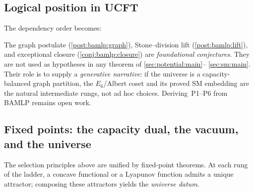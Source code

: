 \subsection{Logical position in UCFT}
\label{sec:bamlp:position}

The dependency order becomes:
\begin{center}
\end{center}

\begin{remark}\label{rem:bamlp:status}
The graph postulate (\autoref{post:bamlp:graph}), Stone--division lift
(\autoref{post:bamlp:lift}), and exceptional closure
(\autoref{conj:bamlp:closure}) are \emph{foundational conjectures}. They are
not used as hypotheses in any theorem of \autoref{sec:potential:main}--%
\autoref{sec:sm:main}. Their role is to supply a \emph{generative narrative}:
if the universe is a capacity-balanced graph partition, the $E_6$/Albert coset
and its proved SM embedding are the natural intermediate rungs, not ad hoc
choices. Deriving~\textnormal{P1--P6} from BAMLP remains open work.
\end{remark}

\subsection{Fixed points: the capacity dual, the vacuum, and the universe}
\label{sec:bamlp:fixedpoint}

The selection principles above are unified by fixed-point theorems. At each rung
of the ladder, a concave functional or a Lyapunov function admits a unique
attractor; composing these attractors yields the \emph{universe datum}.

